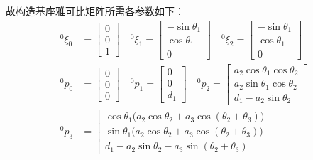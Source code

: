 \documentclass[UTF8, 13pt]{ctexart}
\begin{document}
故构造基座雅可比矩阵所需各参数如下：
\[
\begin{aligned}
    {}^0 \xi_0 &= \begin{bmatrix}
                    0 \\ 0 \\ 1
                \end{bmatrix} \quad
    {}^0 \xi_1 = \begin{bmatrix}
                    -\sin\theta_1 \\ \cos\theta_1 \\ 0
                \end{bmatrix} \quad
    {}^0 \xi_2 = \begin{bmatrix}
                    -\sin\theta_1 \\ \cos\theta_1 \\ 0
                \end{bmatrix} \\
    {}^0 p_0 &= \begin{bmatrix}
                    0 \\ 0 \\ 0
                \end{bmatrix} \quad
    {}^0 p_1 = \begin{bmatrix}
                    0 \\ 0 \\ d_1
                \end{bmatrix} \quad
    {}^0 p_2 = \begin{bmatrix}
                    a_2\cos\theta_1\cos\theta_2 \\
                    a_2\sin\theta_1\cos\theta_2 \\
                    d_1 - a_2\sin\theta_2
                \end{bmatrix} \\
    {}^0 p_3 &= \begin{bmatrix}
                    \cos\theta_1\big(a_2\cos\theta_2 + a_3\cos(\theta_2+\theta_3)\big) \\
                    \sin\theta_1\big(a_2\cos\theta_2 + a_3\cos(\theta_2+\theta_3)\big) \\
                    d_1 - a_2\sin\theta_2 - a_3\sin(\theta_2+\theta_3)
                \end{bmatrix} \\
\end{aligned}
\]
\end{document}
